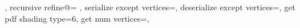 {{		%
		\expandafter\pgfplotsplothandlermesh@setnextvertex\expandafter{\pgfplotspatchclass@rect@A}%
		\expandafter\pgfplotsplothandlermesh@setnextvertex\expandafter{\pgfplotspatchclass@rect@B}%
		\expandafter\pgfplotsplothandlermesh@setnextvertex\expandafter{\pgfplotspatchclass@rect@M}%
		\expandafter\pgfplotsplothandlermesh@setnextvertex\expandafter{\pgfplotspatchclass@rect@B}%
		\expandafter\pgfplotsplothandlermesh@setnextvertex\expandafter{\pgfplotspatchclass@rect@C}%
		\expandafter\pgfplotsplothandlermesh@setnextvertex\expandafter{\pgfplotspatchclass@rect@M}%
		\expandafter\pgfplotsplothandlermesh@setnextvertex\expandafter{\pgfplotspatchclass@rect@D}%
		\expandafter\pgfplotsplothandlermesh@setnextvertex\expandafter{\pgfplotspatchclass@rect@A}%
		\expandafter\pgfplotsplothandlermesh@setnextvertex\expandafter{\pgfplotspatchclass@rect@M}%
		\expandafter\pgfplotsplothandlermesh@setnextvertex\expandafter{\pgfplotspatchclass@rect@C}%
		\expandafter\pgfplotsplothandlermesh@setnextvertex\expandafter{\pgfplotspatchclass@rect@D}%
		\expandafter\pgfplotsplothandlermesh@setnextvertex\expandafter{\pgfplotspatchclass@rect@M}%
		\let\pgfplotsplothandlermesh@patchclass=\pgfplotsplothandlermesh@patchclass@
	},%
	recursive refine@={%
	},%
	serialize except vertices=\let\pgfplotsretval\pgfutil@empty,%
	deserialize except vertices=,
	get pdf shading type=6,
	get num vertices=\def\pgfplotsretval{4},
}%


